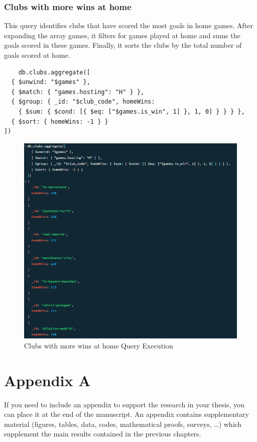 \documentclass{Configuration_Files/PoliMi3i_thesis}
\begin{document}
\subsection{Clubs with more wins at home}
This query identifies clubs that have scored the most goals in home games. After expanding the array games, it filters for games played at home and sums the goals scored in these games. Finally, it sorts the clubs by the total number of goals scored at home.
\begin{verbatim}
    db.clubs.aggregate([
  { $unwind: "$games" },
  { $match: { "games.hosting": "H" } },
  { $group: { _id: "$club_code", homeWins: 
    { $sum: { $cond: [{ $eq: ["$games.is_win", 1] }, 1, 0] } } } },
  { $sort: { homeWins: -1 } }
])
\end{verbatim}
\begin{figure}[htbp]
    \centering
    \includegraphics[scale=0.9]{Images/Queries/Clubs/more_wins_at_home/mwat.png}
    \caption{Clubs with more wins at home Query Execution}
\end{figure}


\cleardoublepage
{} %
\appendix
\chapter{Appendix A}
If you need to include an appendix to support the research in your thesis, you can place it at the end of the manuscript.
An appendix contains supplementary material (figures, tables, data, codes, mathematical proofs, surveys, \dots)
which supplement the main results contained in the previous chapters.


\listoffigures

\cleardoublepage
\end{document}
